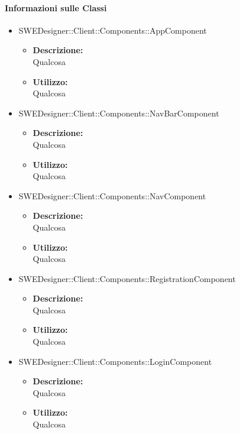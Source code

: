		\paragraph{Informazioni sulle Classi}
		\begin{itemize}
			\item SWEDesigner::Client::Components::AppComponent
			\begin{itemize}
				\item \textbf{Descrizione: }\\
				Qualcosa
				\item \textbf{Utilizzo: }\\
				Qualcosa
			\end{itemize}
			\item SWEDesigner::Client::Components::NavBarComponent
			\begin{itemize}
				\item \textbf{Descrizione: }\\
				Qualcosa
				\item \textbf{Utilizzo: }\\
				Qualcosa
			\end{itemize}
			\item SWEDesigner::Client::Components::NavComponent
			\begin{itemize}
				\item \textbf{Descrizione: }\\
				Qualcosa
				\item \textbf{Utilizzo: }\\
				Qualcosa
			\end{itemize}
			\item SWEDesigner::Client::Components::RegistrationComponent
			\begin{itemize}
				\item \textbf{Descrizione: }\\
				Qualcosa
				\item \textbf{Utilizzo: }\\
				Qualcosa
			\end{itemize}
			\item SWEDesigner::Client::Components::LoginComponent
			\begin{itemize}
				\item \textbf{Descrizione: }\\
				Qualcosa
				\item \textbf{Utilizzo: }\\
				Qualcosa
			\end{itemize}
		\end{itemize}	
	
